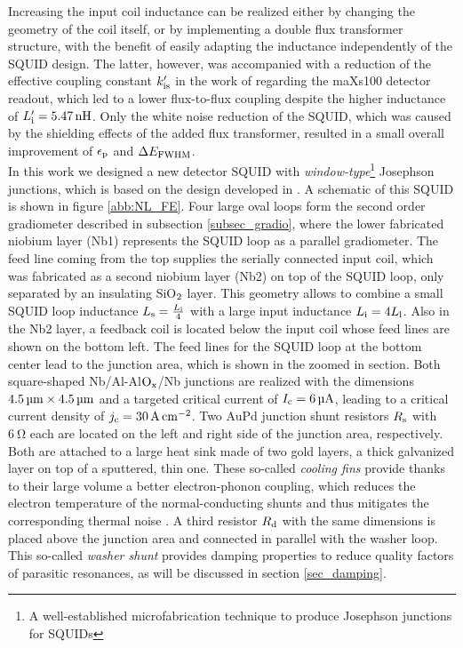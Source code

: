 Increasing the input coil inductance can be realized either by changing the geometry of the coil itself, or by implementing a double flux transformer structure, with the benefit of easily adapting the inductance independently of the SQUID design. The latter, however, was accompanied with a reduction of the effective coupling constant $k_{\rm is}'$ in the work of \cite{Bauer2022} regarding the maXs100 detector readout, which led to a lower flux-to-flux coupling despite the higher inductance of $L_{\rm i}'=\qty{5.47}{\nano\henry}$. Only the white noise reduction of the SQUID, which was caused by the shielding effects of the added flux transformer, resulted in a small overall improvement of $\epsilon_{\rm p}$ and $\Delta E_{\rm FWHM}$. \\
In this work we designed a new detector SQUID with \textit{window-type}\footnote{A well-established microfabrication technique to produce Josephson junctions for SQUIDs} Josephson junctions, which is based on the design developed in \cite{Bauer2022}. A schematic of this SQUID is shown in figure \ref{abb:NL_FE}. Four large oval loops form the second order gradiometer described in subsection \ref{subsec_gradio}, where the lower fabricated niobium layer (Nb1) represents the SQUID loop as a parallel gradiometer. The feed line coming from the top supplies the serially connected input coil, which was fabricated as a second niobium layer (Nb2) on top of the SQUID loop, only separated by an insulating SiO$_{\rm 2}$ layer. This geometry allows to combine a small SQUID loop inductance $L_{\rm s}=\frac{L_{\rm l}}{4}$ with a large input inductance $L_{\rm i}=4L_{\rm l}$. Also in the Nb2 layer, a feedback coil is located below the input coil whose feed lines are shown on the bottom left. The feed lines for the SQUID loop at the bottom center lead to the junction area, which is shown in the zoomed in section. Both square-shaped Nb/Al-Al$\rm O_x$/Nb junctions are realized with the dimensions $\qtyproduct{4.5 x 4.5}{\micro\meter}$ and a targeted critical current of $I_{\rm c}=\qty{6}{\micro\ampere}$, leading to a critical current density of $j_{\rm c}=\qty{30}{\ampere\per\centi\meter\squared}$. Two AuPd junction shunt resistors $R_{\rm s}$ with $\qty{6}{\ohm}$ each are located on the left and right side of the junction area, respectively. Both are attached to a large heat sink made of two gold layers, a thick galvanized layer on top of a sputtered, thin one. These so-called \textit{cooling fins} provide thanks to their large volume a better electron-phonon coupling, which reduces the electron temperature of the normal-conducting shunts and thus mitigates the corresponding thermal noise \cite{Mazibrada2024}. A third resistor $R_{\rm d}$ with the same dimensions is placed above the junction area and connected in parallel with the washer loop. This so-called \textit{washer shunt} provides damping properties to reduce quality factors of parasitic resonances, as will be discussed in section \ref{sec_damping}. \\

